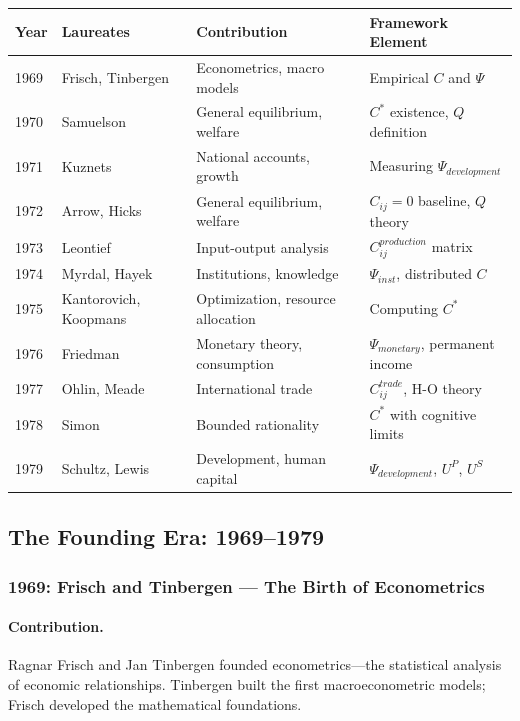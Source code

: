 \begin{center}
\renewcommand{\arraystretch}{1.15}
\small
\begin{tabular}{llll}
\hline
\textbf{Year} & \textbf{Laureates} & \textbf{Contribution} & \textbf{Framework Element} \\
\hline
1969 & Frisch, Tinbergen & Econometrics, macro models & Empirical $C$ and $\Psi$ \\
1970 & Samuelson & General equilibrium, welfare & $C^*$ existence, $Q$ definition \\
1971 & Kuznets & National accounts, growth & Measuring $\Psi_{development}$ \\
1972 & Arrow, Hicks & General equilibrium, welfare & $C_{ij} = 0$ baseline, $Q$ theory \\
1973 & Leontief & Input-output analysis & $C^{production}_{ij}$ matrix \\
1974 & Myrdal, Hayek & Institutions, knowledge & $\Psi_{inst}$, distributed $C$ \\
1975 & Kantorovich, Koopmans & Optimization, resource allocation & Computing $C^*$ \\
1976 & Friedman & Monetary theory, consumption & $\Psi_{monetary}$, permanent income \\
1977 & Ohlin, Meade & International trade & $C^{trade}_{ij}$, H-O theory \\
1978 & Simon & Bounded rationality & $C^*$ with cognitive limits \\
1979 & Schultz, Lewis & Development, human capital & $\Psi_{development}$, $U^P$, $U^S$ \\
\hline
\end{tabular}
\end{center}

\subsection{The Founding Era: 1969--1979}

\subsubsection{1969: Frisch and Tinbergen --- The Birth of Econometrics}

\paragraph{Contribution.}
Ragnar Frisch and Jan Tinbergen founded econometrics---the statistical
analysis of economic relationships. Tinbergen built the first macroeconometric
models; Frisch developed the mathematical foundations.

